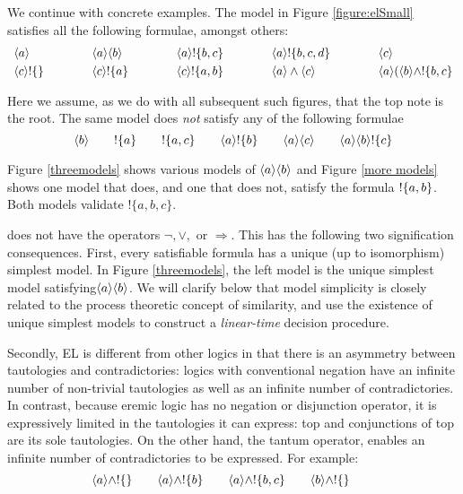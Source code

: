 

We continue with concrete examples.  The model in Figure
\ref{figure:elSmall} satisfies all the following formulae, amongst
others:
\[
\begin{array}{lclclclcl}
\MAY{a} &\qquad&
\MAY{a} \MAY{b} &\qquad&
\MAY{a} \fBang \{b,c\} &\qquad&
\MAY{a} \fBang \{b,c,d\} &\qquad&
\MAY{c} \\[1mm]
\MAY{c} \fBang \{\} &&
\MAY{c} \fBang \{a\} &&
\MAY{c} \fBang \{a,b\} &&
\MAY{a} \land \MAY{c} &&
\MAY{a} (\MAY{b} \land \fBang \{b,c\}
\end{array}
\]

\NI Here we assume, as we do with all subsequent such figures, that
the top note is the root.  The same model does \emph{not} satisfy any
of the following formulae
\[
\langle b \rangle \qquad
! \{a\} \qquad
! \{a, c\} \qquad
\langle a \rangle ! \{b\} \qquad
\langle a \rangle \langle c \rangle \qquad
\langle a \rangle \langle b \rangle ! \{c\} 
\]

\NI Figure \ref{threemodels} shows various models of $\MAY{a} \MAY{b}$
and Figure \ref{more models} shows one model that does, and one that
does not, satisfy the formula $! \{a,b\}$.  Both models validate
$!\{a, b, c\}$.

\ELABR{} does not have the operators $\neg, \lor, $ or $\Rightarrow$.
This has the following two signification consequences.  First, every
satisfiable formula has a unique (up to isomorphism) simplest model.
In Figure \ref{threemodels}, the left model is the unique simplest
model satisfying$\MAY{a} \MAY{b}$.  We will clarify below that model
simplicity is closely related to the process theoretic concept of
similarity, and use the existence of unique simplest models to
construct a \emph{linear-time} decision procedure.





Secondly, EL is different from other logics in that there is an
asymmetry between tautologies and contradictories: logics with
conventional negation have an infinite number of non-trivial
tautologies as well as an infinite number of contradictories.  In
contrast, because eremic logic has no negation or disjunction
operator, it is expressively limited in the tautologies it can
express: top and conjunctions of top are its sole tautologies. On the
other hand, the tantum operator, enables an infinite number of
contradictories to be expressed.  For example:
\[
   \langle a \rangle \land ! \{\} \qquad
   \langle a \rangle \land ! \{b\} \qquad
   \langle a \rangle \land ! \{b, c\} \qquad
   \langle b \rangle \land ! \{\} \qquad
\]



